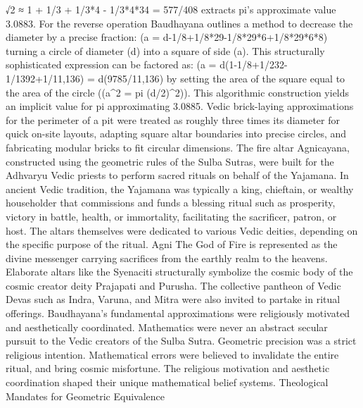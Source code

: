 √2 ≈ 1 + {1}/{3} + {1}/{3*4} - {1}/{3*4*34} = {577}/{408}
extracts pi’s approximate value 3.0883.
For the reverse operation Baudhayana outlines a method to decrease the diameter by a precise fraction:
(a = d-{1}/{8}+{1}/{8*29}-{1}/{8*29*6}+{1}/{8*29*6*8})
turning a circle of diameter (d) into a square of side (a). This structurally sophisticated expression can be factored as: 
(a = d(1-{1}/{8}+{1}/{232}-{1}/{1392}+{1}/{11,136}) = d({9785}/{11,136})
by setting the area of the square equal to the area of the circle ((a^2 = pi (d/2)^2)).
This algorithmic construction yields an implicit value for pi approximating 3.0885. Vedic brick-laying approximations for the perimeter of a pit were treated as roughly three times its diameter for quick on-site layouts, adapting square altar boundaries into precise circles, and fabricating modular bricks to fit circular dimensions. The fire altar Agnicayana, constructed using the geometric rules of the Sulba Sutras, were built for the Adhvaryu Vedic priests to perform sacred rituals on behalf of the Yajamana. 
In ancient Vedic tradition, the Yajamana was typically a king, chieftain, or wealthy householder that commissions and funds a blessing ritual such as prosperity, victory in battle, health, or immortality, facilitating the sacrificer, patron, or host. The altars themselves were dedicated to various Vedic deities, depending on the specific purpose of the ritual. Agni The God of Fire is represented as the divine messenger carrying sacrifices from the earthly realm to the heavens. Elaborate altars like the Syenaciti structurally symbolize the cosmic body of the cosmic creator deity Prajapati and Purusha. The collective pantheon of Vedic Devas such as Indra, Varuna, and Mitra were also invited to partake in ritual offerings. Baudhayana's fundamental approximations were religiously motivated and aesthetically coordinated. Mathematics were never an abstract secular pursuit to the Vedic creators of the Sulba Sutra. Geometric precision was a strict religious intention. Mathematical errors were believed to invalidate the entire ritual, and bring cosmic misfortune. The religious motivation and aesthetic coordination shaped their unique mathematical belief systems. 
Theological Mandates for Geometric Equivalence
